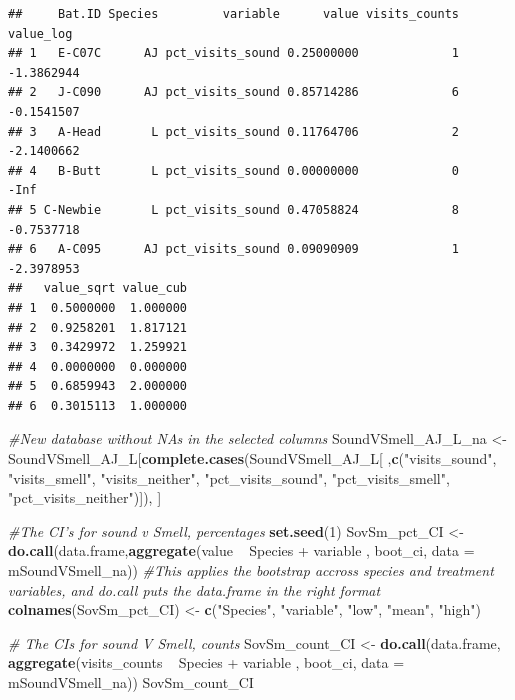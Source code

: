\documentclass[]{article}
\newenvironment{Shaded}{\begin{snugshade}}{\end{snugshade}}
\newcommand{\KeywordTok}[1]{\textcolor[rgb]{0.13,0.29,0.53}{\textbf{{#1}}}}
\newcommand{\DataTypeTok}[1]{\textcolor[rgb]{0.13,0.29,0.53}{{#1}}}
\newcommand{\DecValTok}[1]{\textcolor[rgb]{0.00,0.00,0.81}{{#1}}}
\newcommand{\StringTok}[1]{\textcolor[rgb]{0.31,0.60,0.02}{{#1}}}
\newcommand{\CommentTok}[1]{\textcolor[rgb]{0.56,0.35,0.01}{\textit{{#1}}}}
\newcommand{\NormalTok}[1]{{#1}}
\begin{document}
\begin{verbatim}
##     Bat.ID Species         variable      value visits_counts  value_log
## 1   E-C07C      AJ pct_visits_sound 0.25000000             1 -1.3862944
## 2   J-C090      AJ pct_visits_sound 0.85714286             6 -0.1541507
## 3   A-Head       L pct_visits_sound 0.11764706             2 -2.1400662
## 4   B-Butt       L pct_visits_sound 0.00000000             0       -Inf
## 5 C-Newbie       L pct_visits_sound 0.47058824             8 -0.7537718
## 6   A-C095      AJ pct_visits_sound 0.09090909             1 -2.3978953
##   value_sqrt value_cub
## 1  0.5000000  1.000000
## 2  0.9258201  1.817121
## 3  0.3429972  1.259921
## 4  0.0000000  0.000000
## 5  0.6859943  2.000000
## 6  0.3015113  1.000000
\end{verbatim}

\begin{Shaded}
\begin{Highlighting}[]
\CommentTok{#New database without NAs in the selected columns}
\NormalTok{SoundVSmell_AJ_L_na <-}\StringTok{ }\NormalTok{SoundVSmell_AJ_L[}\KeywordTok{complete.cases}\NormalTok{(SoundVSmell_AJ_L[ ,}\KeywordTok{c}\NormalTok{(}\StringTok{"visits_sound"}\NormalTok{, }\StringTok{"visits_smell"}\NormalTok{,  }\StringTok{"visits_neither"}\NormalTok{, }\StringTok{"pct_visits_sound"}\NormalTok{, }\StringTok{"pct_visits_smell"}\NormalTok{, }\StringTok{"pct_visits_neither"}\NormalTok{)]), ]}

\CommentTok{#The CI's for sound v Smell, percentages}
\KeywordTok{set.seed}\NormalTok{(}\DecValTok{1}\NormalTok{)}
\NormalTok{SovSm_pct_CI <-}\StringTok{ }\KeywordTok{do.call}\NormalTok{(data.frame,}\KeywordTok{aggregate}\NormalTok{(value ~}\StringTok{ }\NormalTok{Species +}\StringTok{ }\NormalTok{variable , boot_ci, }\DataTypeTok{data =} \NormalTok{mSoundVSmell_na)) }\CommentTok{#This applies the bootstrap accross species and treatment variables, and do.call puts the data.frame in the right format}
\KeywordTok{colnames}\NormalTok{(SovSm_pct_CI) <-}\StringTok{ }\KeywordTok{c}\NormalTok{(}\StringTok{"Species"}\NormalTok{, }\StringTok{"variable"}\NormalTok{, }\StringTok{"low"}\NormalTok{, }\StringTok{"mean"}\NormalTok{, }\StringTok{"high"}\NormalTok{)}

\CommentTok{# The CIs for sound V Smell, counts}
\NormalTok{SovSm_count_CI <-}\StringTok{ }\KeywordTok{do.call}\NormalTok{(data.frame, }\KeywordTok{aggregate}\NormalTok{(visits_counts ~}\StringTok{ }\NormalTok{Species +}\StringTok{ }\NormalTok{variable , boot_ci, }\DataTypeTok{data =} \NormalTok{mSoundVSmell_na))}
\NormalTok{SovSm_count_CI}
\end{Highlighting}
\end{Shaded}
\end{document}
